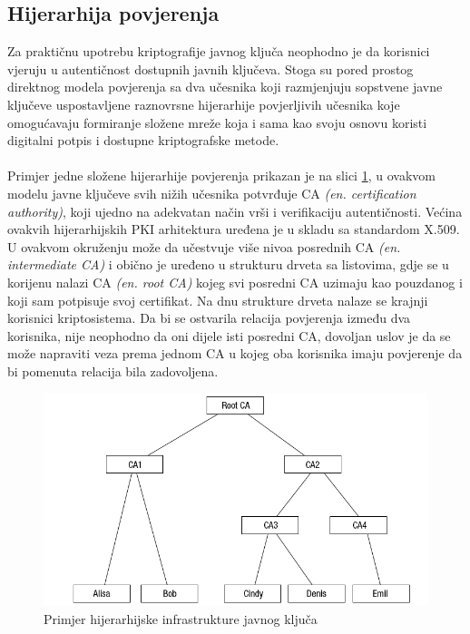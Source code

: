 \subsection{Hijerarhija povjerenja}
Za praktičnu upotrebu kriptografije javnog ključa neophodno je da korisnici vjeruju u autentičnost dostupnih javnih ključeva. Stoga su pored prostog direktnog modela povjerenja sa dva učesnika koji razmjenjuju sopstvene javne ključeve uspostavljene raznovrsne hijerarhije povjerljivih učesnika koje omogućavaju formiranje složene mreže\cite{x509} koja i sama kao svoju osnovu koristi digitalni potpis i dostupne kriptografske metode.

\paragraph*{}
Primjer jedne složene hijerarhije povjerenja prikazan je na slici \ref{fig:pki}, u ovakvom modelu javne ključeve svih nižih učesnika potvrđuje CA \textit{(en. certification authority)}, koji ujedno na adekvatan način vrši i verifikaciju autentičnosti. Većina ovakvih hijerarhijskih PKI arhitektura uređena je u skladu sa standardom X.509. U ovakvom okruženju može da učestvuje više nivoa posrednih CA \textit{(en. intermediate CA)} i obično je uređeno u strukturu drveta sa listovima, gdje se u korijenu nalazi CA \textit{(en. root CA)} kojeg svi posredni CA uzimaju kao pouzdanog i koji sam potpisuje svoj certifikat. Na dnu strukture drveta nalaze se krajnji korisnici kriptosistema. Da bi se ostvarila relacija povjerenja između dva korisnika, nije neophodno da oni dijele isti posredni CA, dovoljan uslov je da se može napraviti veza prema jednom CA u kojeg oba korisnika imaju povjerenje da bi pomenuta relacija bila zadovoljena.\cite{buchmann2013introduction}

\begin{figure}[H]
    \centering
    \includegraphics[width=1.0\textwidth]{material/pki}
    \caption{Primjer hijerarhijske infrastrukture javnog ključa}
    \label{fig:pki}
\end{figure}

